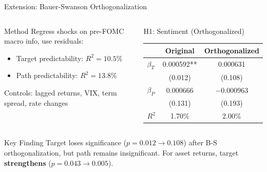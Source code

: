 \documentclass[aspectratio=169, 11pt]{beamer}
\begin{document}
\begin{frame}{Extension: Bauer-Swanson Orthogonalization}
\begin{columns}[T]
\begin{ablock}{Method}
Regress shocks on pre-FOMC macro info, use residuals:
\begin{itemize}
  \item Target predictability: $R^2 = 10.5\%$
  \item Path predictability: $R^2 = 13.8\%$
\end{itemize}
\vspace{0.2em}
{\small Controls: lagged returns, VIX, term spread, rate changes}
\end{ablock}

\begin{ablock}{H1: Sentiment (Orthogonalized)}
{\small
\begin{tabular}{lcc}
\toprule
 & Original & Orthogonalized \\
\midrule
$\beta_T$ & 0.000592** & 0.000631 \\
 & (0.012) & (0.108) \\
$\beta_P$ & 0.000666 & $-0.000963$ \\
 & (0.131) & (0.193) \\
\midrule
$R^2$ & 1.70\% & 2.00\% \\
\bottomrule
\end{tabular}
}
\end{ablock}
\end{columns}

\vspace{0.3em}
\begin{aalertblock}{Key Finding}
Target loses significance ($p = 0.012 \to 0.108$) after B-S orthogonalization, but path remains insignificant. For asset returns, target \textbf{strengthens} ($p = 0.043 \to 0.005$).
\end{aalertblock}
\end{frame}
\end{document}
